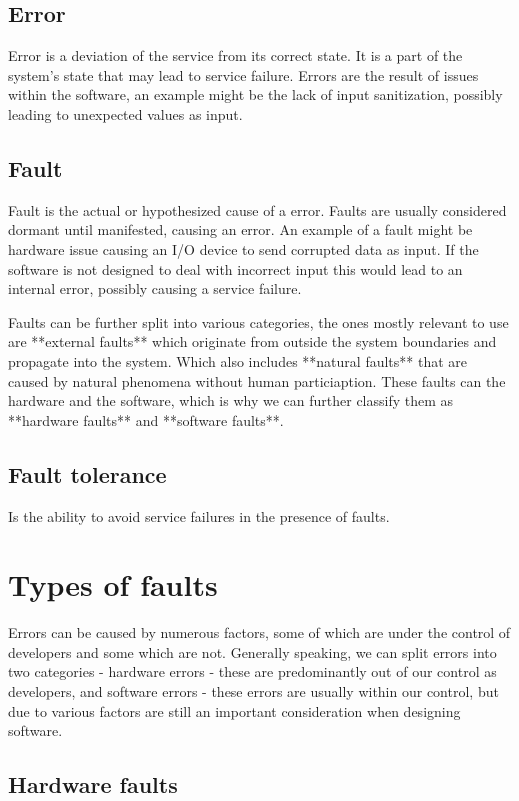 \documentclass[12pt, letterpaper]{article}
\begin{document}
\subsection{Error}
Error is a deviation of the service from its correct state. It is a part of the system's state that may lead to service failure. Errors are the result of issues within the software, an example might be the lack of input sanitization, possibly leading to unexpected values as input.

\subsection{Fault}
Fault is the actual or hypothesized cause of a error. Faults are usually considered dormant until manifested, causing an error. An example of a fault might be hardware issue causing an I/O device to send corrupted data as input. If the software is not designed to deal with incorrect input this would lead to an internal error, possibly causing a service failure.

Faults can be further split into various categories, the ones mostly relevant to use are **external faults** which originate from outside the system boundaries and propagate into the system. Which also includes **natural faults** that are caused by natural phenomena without human particiaption. These faults can the hardware and the software, which is why we can further classify them as **hardware faults** and **software faults**.

\subsection{Fault tolerance}
Is the ability to avoid service failures in the presence of faults.

\section{Types of faults}

Errors can be caused by numerous factors, some of which are under the control of developers and some which are not. Generally speaking, we can split errors into two categories - hardware errors - these are predominantly out of our control as developers, and software errors - these errors are usually within our control, but due to various factors are still an important consideration when designing software.

\subsection{Hardware faults}
\end{document}

